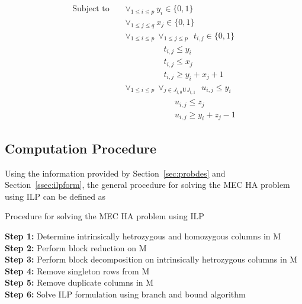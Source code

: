 \documentclass[10pt,twocolumn]{witseiepaper}
\begin{document}
\begin{equation*}
\begin{split}
    \textrm{Subject to} 
    &\ \ \ \ \vee_{1 \le i \le p} y_i \in \{0, 1\}                                              \\
    &\ \ \ \ \vee_{1 \le j \le q} x_j \in \{0, 1\}                                              \\
    &\ \ \ \ \vee_{1 \le i \le p} \vee_{1 \le j \le p} \ \ t_{i,j} \in \{0, 1\}                 \\
    &\ \ \ \ \ \ \ \ \ \ \ \ \ \ \ \ \ \ \ \ \ \ \ \ \ \ t_{i,j} \le y_i                        \\ 
    &\ \ \ \ \ \ \ \ \ \ \ \ \ \ \ \ \ \ \ \ \ \ \ \ \ \ t_{i,j} \le x_j                        \\ 
    &\ \ \ \ \ \ \ \ \ \ \ \ \ \ \ \ \ \ \ \ \ \ \ \ \ \ t_{i,j} \ge y_i + x_j + 1              \\
    &\ \ \ \ \vee_{1 \le i \le p} \vee_{j \in J_{i,0} \textrm{U} J_{i,1}} \ \ u_{i,j} \le y_i   \\
    &\ \ \ \ \ \ \ \ \ \ \ \ \ \ \ \ \ \ \ \ \ \ \ \ \ \ \ \ \ \ \ \ u_{i,j} \le z_j            \\
    &\ \ \ \ \ \ \ \ \ \ \ \ \ \ \ \ \ \ \ \ \ \ \ \ \ \ \ \ \ \ \ \ u_{i,j} \ge y_i + z_j - 1 
    \end{split}
\end{equation*}

\subsection{Computation Procedure}

Using the information provided by Section~\ref{sec:probdes} and Section~\ref{ssec:ilpform}, the general
procedure for solving the MEC HA problem using ILP can be defined as
\begin{algorithm}[t*]\label{alg:proc}
    \small
    \caption{Procedure for solving the MEC HA problem using ILP}
\textbf{Step 1:} Determine intrinsically hetrozygous and homozygous columns in M                        \\
\textbf{Step 2:} Perform block reduction on M                                                           \\
\textbf{Step 3:} Perform block decomposition on intrinsically hetrozygous columns in M                 	\\
\textbf{Step 4:} Remove singleton rows from M                                                           \\
\textbf{Step 5:} Remove duplicate columns in M								\\
\textbf{Step 6:} Solve ILP formulation using branch and bound algorithm 
\end{algorithm}
\end{document}
